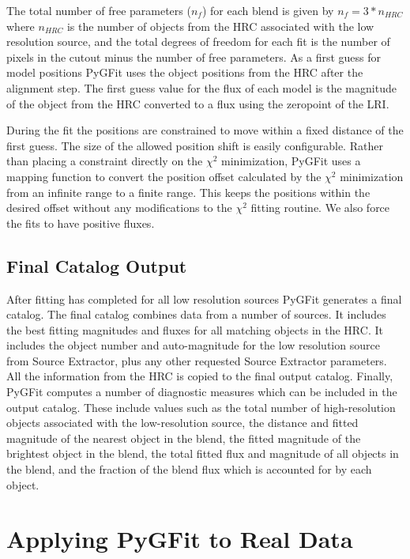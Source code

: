 \documentclass[apj]{emulateapj}
\newcommand{\pygfit}{PyGFit}
\newcommand{\extractor}{Source Extractor}
\begin{document}
The total number of free parameters ($n_f$) for each blend is given by $n_f=3*n_{HRC}$ where $n_{HRC}$ is the number of objects from the HRC associated with the low resolution source, and the total degrees of freedom for each fit is the number of pixels in the cutout minus the number of free parameters.  As a first guess for model positions \pygfit{} uses the object positions from the HRC after the alignment step.  The first guess value for the flux of each model is the magnitude of the object from the HRC converted to a flux using the zeropoint of the LRI.

During the fit the positions are constrained to move within a fixed distance of the first guess.  The size of the allowed position shift is easily configurable.  Rather than placing a constraint directly on the $\chi^2$ minimization, \pygfit{} uses a mapping function to convert the position offset calculated by the $\chi^2$ minimization from an infinite range to a finite range.  This keeps the positions within the desired offset without any modifications to the $\chi^2$  fitting routine.  We also force the fits to have positive fluxes.

\subsection{Final Catalog Output}\label{sec:catalog}

After fitting has completed for all low resolution sources \pygfit{} generates a final catalog.  The final catalog combines data from a number of sources.  It includes the best fitting magnitudes and fluxes for all matching objects in the HRC.  It includes the object number and auto-magnitude for the low resolution source from \extractor{}, plus any other requested \extractor{} parameters.  All the information from the HRC is copied to the final output catalog.  Finally, \pygfit{} computes a number of diagnostic measures which can be included in the output catalog.  These include values such as the total number of high-resolution objects associated with the low-resolution source, the distance and fitted magnitude of the nearest object in the blend, the fitted magnitude of the brightest object in the blend, the total fitted flux and magnitude of all objects in the blend, and the fraction of the blend flux which is accounted for by each object.

\section{Applying PyGFit to Real Data}\label{sec:example}
\end{document}
